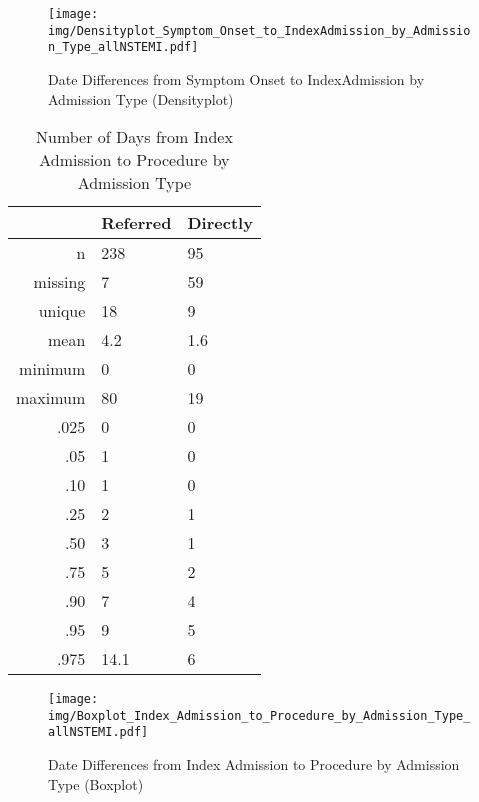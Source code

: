 \documentclass[presentation,xcolor=pdftex,dvipsnames,table,11pt]{beamer}
\begin{document}
\begin{tiny}
\begin{frame}
\begin{figure}
  \centering
  \caption{Date Differences from Symptom Onset to IndexAdmission by Admission Type (Densityplot)}
  \label{Density: Date Differences from Symptom Onset to IndexAdmission by Admission Type}
\texttt{[image: img/Densityplot\_Symptom\_Onset\_to\_IndexAdmission\_by\_Admission\_Type\_allNSTEMI.pdf]}\end{figure}
\end{frame}




\begin{table}[ht]
\centering
\begin{tabular}{rll}
  \toprule
 & Referred & Directly \\ 
  \midrule
n & 238 & 95 \\ 
  missing & 7 & 59 \\ 
  unique & 18 & 9 \\ 
  mean & 4.2 & 1.6 \\ 
  minimum & 0 & 0 \\ 
  maximum & 80 & 19 \\ 
  .025 & 0 & 0 \\ 
  .05 & 1 & 0 \\ 
  .10 & 1 & 0 \\ 
  .25 & 2 & 1 \\ 
  .50 & 3 & 1 \\ 
  .75 & 5 & 2 \\ 
  .90 & 7 & 4 \\ 
  .95 & 9 & 5 \\ 
  .975 & 14.1 & 6 \\ 
   \bottomrule
\end{tabular}
\caption{Number of Days from Index Admission to Procedure by Admission Type} 
\end{table}
\begin{frame}
\begin{figure}
  \centering
  \caption{Date Differences from Index Admission to Procedure by Admission Type (Boxplot)}
  \label{Boxplot: Date Differences from Index Admission to Procedure by Admission Type}
\texttt{[image: img/Boxplot\_Index\_Admission\_to\_Procedure\_by\_Admission\_Type\_allNSTEMI.pdf]}\end{figure}
\end{frame}



\end{tiny}
\end{document}
